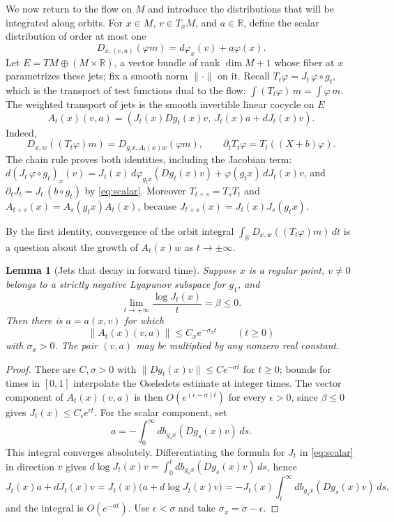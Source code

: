 \documentclass[11pt]{article}
\newtheorem{lemma}[theorem]{Lemma}
\theoremstyle{remark}
\newcommand{\R}{\mathbb R}
\begin{document}
We now return to the flow on \(M\) and introduce the distributions
that will be integrated along orbits.
For \(x\in M\), \(v\in T_xM\), and \(a\in\R\), define the scalar
distribution of order at most one
\[
 D_{x,(v,a)}(\varphi m)=d\varphi_x(v)+a\varphi(x).
\]
Let \(E=TM\oplus(M\times\R)\), a vector bundle of rank
\(\dim M+1\) whose fiber at \(x\) parametrizes these jets; fix a
smooth norm \(\|\cdot\|\) on it.
Recall \(T_t\varphi=J_t\,\varphi\circ g_t\), which is the transport of
test functions dual to the flow: \(\int(T_t\varphi)\,m=\int\varphi\,m\).
The weighted transport of jets is the smooth invertible
linear cocycle on \(E\)
\begin{equation}\label{eq:jet-cocycle}
 A_t(x)(v,a)=
 \left(J_t(x)Dg_t(x)v,\ J_t(x)a+dJ_t(x)v\right).
\end{equation}
Indeed,
\begin{equation}\label{eq:jet-transport}
 D_{x,w}((T_t\varphi)m)
       =D_{g_tx,A_t(x)w}(\varphi m),\qquad
 \partial_t T_t\varphi=T_t((X+b)\varphi).
\end{equation}
The chain rule proves both identities, including the Jacobian term:
\(d(J_t\,\varphi\circ g_t)_x(v)=J_t(x)\,d\varphi_{g_tx}(Dg_t(x)v)
+\varphi(g_tx)\,dJ_t(x)v\), and
\(\partial_tJ_t=J_t\,(b\circ g_t)\) by \eqref{eq:scalar}.
Moreover \(T_{t+s}=T_sT_t\) and
\(A_{t+s}(x)=A_s(g_tx)A_t(x)\), because
\(J_{t+s}(x)=J_t(x)J_s(g_tx)\).

By the first identity, convergence of the orbit integral
\(\int_\R D_{x,w}((T_t\varphi)m)\,dt\) is a question about the growth
of \(A_t(x)w\) as \(t\to\pm\infty\).

\begin{lemma}[Jets that decay in forward time]\label{lem:forward}
Suppose \(x\) is a regular point, \(v\ne0\) belongs to a strictly
negative Lyapunov subspace for \(g_1\), and
\[
 \lim_{t\to+\infty}\frac{\log J_t(x)}t=\beta\le0.
\]
Then there is \(a=a(x,v)\) for which
\begin{equation}\label{eq:forward-decay}
 \|A_t(x)(v,a)\|\le C_x e^{-\sigma_x t}\qquad(t\ge0)
\end{equation}
with \(\sigma_x>0\).
The pair \((v,a)\) may be multiplied by any nonzero real constant.
\end{lemma}
\begin{proof}
There are \(C,\sigma>0\) with \(\|Dg_t(x)v\|\le Ce^{-\sigma t}\)
for \(t\ge0\); bounds for times in \([0,1]\) interpolate the
Oseledets estimate at integer times.
The vector component of \(A_t(x)(v,a)\) is then
\(O(e^{(\epsilon-\sigma)t})\) for every \(\epsilon>0\), since
\(\beta\le0\) gives \(J_t(x)\le C_\epsilon e^{\epsilon t}\).
For the scalar component, set
\begin{equation}\label{eq:stable-correction}
 a=-\int_0^\infty db_{g_sx}(Dg_s(x)v)\,ds .
\end{equation}
This integral converges absolutely.  Differentiating the formula for
\(J_t\) in \eqref{eq:scalar} in direction \(v\) gives
\(d\log J_t(x)v=\int_0^tdb_{g_sx}(Dg_s(x)v)\,ds\), hence
\[
 J_t(x)a+dJ_t(x)v=J_t(x)\bigl(a+d\log J_t(x)v\bigr)
       =-J_t(x)\int_t^\infty db_{g_sx}(Dg_s(x)v)\,ds,
\]
and the integral is \(O(e^{-\sigma t})\).
Use \(\epsilon<\sigma\) and take \(\sigma_x=\sigma-\epsilon\).
\end{proof}
\end{document}

